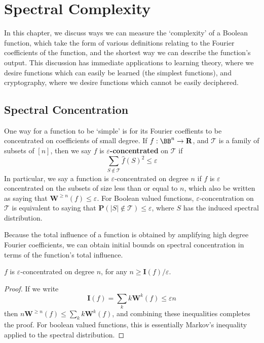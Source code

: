 \chapter{Spectral Complexity}

In this chapter, we discuss ways we can measure the `complexity' of a Boolean function, which take the form of various definitions relating to the Fourier coefficients of the function, and the shortest way we can describe the function's output. This discussion has immediate applications to learning theory, where we desire functions which can easily be learned (the simplest functions), and cryptography, where we desire functions which cannot be easily deciphered.

\section{Spectral Concentration}

One way for a function to be `simple' is for its Fourier coeffients to be concentrated on coefficients of small degree. If $f: \BB^n \to \mathbf{R}$, and $\mathcal{T}$ is a family of subsets of $[n]$, then we say $f$ is {\bf $\varepsilon$-concentrated} on $\mathcal{T}$ if
%
\[ \sum_{S \not \in \mathcal{T}} \widehat{f}(S)^2 \leq \varepsilon \]
%
In particular, we say a function is $\varepsilon$-concentrated on degree $n$ if $f$ is $\varepsilon$ concentrated on the subsets of size less than or equal to $n$, which also be written as saying that $\mathbf{W}^{\geq n}(f) \leq \varepsilon$. For Boolean valued functions, $\varepsilon$-concentration on $\mathcal{T}$ is equivalent to saying that $\mathbf{P}(|S| \not \in \mathcal{T}) \leq \varepsilon$, where $S$ has the induced spectral distribution.

Because the total influence of a function is obtained by amplifying high degree Fourier coefficients, we can obtain initial bounds on spectral concentration in terms of the function's total influence.

\begin{theorem}
    $f$ is $\varepsilon$-concentrated on degree $n$, for any $n \geq \mathbf{I}(f)/\varepsilon$.
\end{theorem}
\begin{proof}
    If we write
    \[ \mathbf{I}(f) = \sum_k k \mathbf{W}^k(f) \leq \varepsilon n \]
    then $n \mathbf{W}^{\geq n}(f) \leq \sum_k k \mathbf{W}^k(f)$, and combining these inequalities completes the proof. For boolean valued functions, this is essentially Markov's inequality applied to the spectral distribution.
\end{proof}

